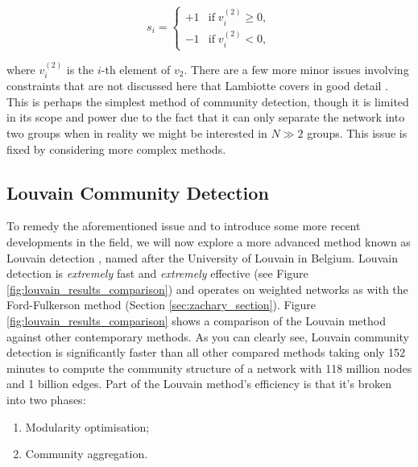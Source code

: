 $$ s_i = \begin{cases}
    +1 & \text{if} \; v_i^{(2)} \geq 0, \\
    -1 & \text{if} \; v_i^{(2)} < 0,
\end{cases} $$

\noindent
where $v_i^{(2)}$ is the $i$-th element of $v_2$. There are a few more minor issues involving constraints that are not discussed here that Lambiotte covers in good detail \cite[27]{oxford:renaud_notes}. This is perhaps the simplest method of community detection, though it is limited in its scope and power due to the fact that it can only separate the network into two groups when in reality we might be interested in $N \gg 2$ groups. This issue is fixed by considering more complex methods.

\subsection{Louvain Community Detection}
To remedy the aforementioned issue and to introduce some more recent developments in the field, we will now explore a more advanced method known as Louvain detection \cite{Blondel_2008}, named after the University of Louvain in Belgium. Louvain detection is \emph{extremely} fast and \emph{extremely} effective (see Figure \ref{fig:louvain_results_comparison}) and operates on weighted networks as with the Ford-Fulkerson method (Section \ref{sec:zachary_section}). Figure \ref{fig:louvain_results_comparison} shows a comparison of the Louvain method against other contemporary methods. As you can clearly see, Louvain community detection is significantly faster than all other compared methods taking only 152 minutes to compute the community structure of a network with 118 million nodes and 1 billion edges. Part of the Louvain method's efficiency is that it's broken into two phases:

\begin{enumerate}
    \item Modularity optimisation;
    \item Community aggregation.
\end{enumerate}


